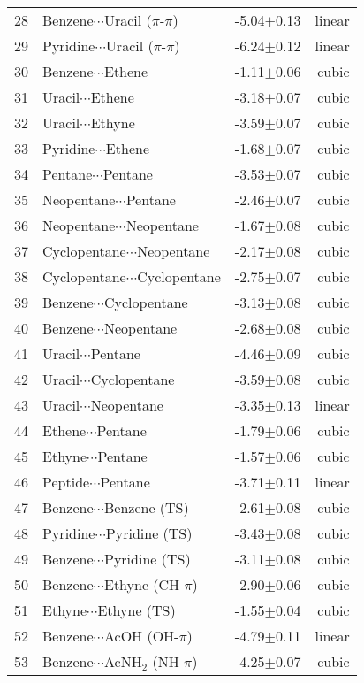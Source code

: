 \begin{longtable}{llrr}
28 & Benzene$\cdots$Uracil ($\pi$-$\pi$) & -5.04$\pm$0.13 & linear \\
29 & Pyridine$\cdots$Uracil ($\pi$-$\pi$) & -6.24$\pm$0.12 & linear \\
30 & Benzene$\cdots$Ethene & -1.11$\pm$0.06 & cubic \\
31 & Uracil$\cdots$Ethene & -3.18$\pm$0.07 & cubic \\
32 & Uracil$\cdots$Ethyne & -3.59$\pm$0.07 & cubic \\
33 & Pyridine$\cdots$Ethene & -1.68$\pm$0.07 & cubic \\
34 & Pentane$\cdots$Pentane & -3.53$\pm$0.07 & cubic \\
35 & Neopentane$\cdots$Pentane & -2.46$\pm$0.07 & cubic \\
36 & Neopentane$\cdots$Neopentane & -1.67$\pm$0.08 & cubic \\
37 & Cyclopentane$\cdots$Neopentane & -2.17$\pm$0.08 & cubic \\
38 & Cyclopentane$\cdots$Cyclopentane & -2.75$\pm$0.07 & cubic \\
39 & Benzene$\cdots$Cyclopentane & -3.13$\pm$0.08 & cubic \\
40 & Benzene$\cdots$Neopentane & -2.68$\pm$0.08 & cubic \\
41 & Uracil$\cdots$Pentane & -4.46$\pm$0.09 & cubic \\
42 & Uracil$\cdots$Cyclopentane & -3.59$\pm$0.08 & cubic \\
43 & Uracil$\cdots$Neopentane & -3.35$\pm$0.13 & linear \\
44 & Ethene$\cdots$Pentane & -1.79$\pm$0.06 & cubic \\
45 & Ethyne$\cdots$Pentane & -1.57$\pm$0.06 & cubic \\
46 & Peptide$\cdots$Pentane & -3.71$\pm$0.11 & linear \\
47 & Benzene$\cdots$Benzene (TS) & -2.61$\pm$0.08 & cubic \\
48 & Pyridine$\cdots$Pyridine (TS) & -3.43$\pm$0.08 & cubic \\
49 & Benzene$\cdots$Pyridine (TS) & -3.11$\pm$0.08 & cubic \\
50 & Benzene$\cdots$Ethyne (CH-$\pi$) & -2.90$\pm$0.06 & cubic \\
51 & Ethyne$\cdots$Ethyne (TS) & -1.55$\pm$0.04 & cubic \\
52 & Benzene$\cdots$AcOH (OH-$\pi$) & -4.79$\pm$0.11 & linear \\
53 & Benzene$\cdots$AcNH$_2$ (NH-$\pi$) & -4.25$\pm$0.07 & cubic \\

\end{longtable}
